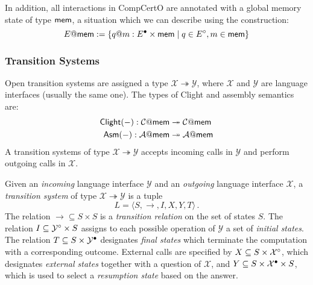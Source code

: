 \documentclass[acmsmall,review,anonymous]{acmart}\settopmatter{printfolios=true,printccs=false,printacmref=false}
\begin{document}
In addition,
all interactions in CompCertO
are annotated with a global memory state of type $ \mathsf{mem} $,
a situation which we can describe using the construction:
\[
  E@ \mathsf{mem}  := \{ q@m : E^\bullet \times  \mathsf{mem}  \mid
                   q \in E^\circ, m \in  \mathsf{mem}  \}
\]


\subsubsection{Transition Systems}

Open transition systems
are assigned a type
$\mathcal{X} \twoheadrightarrow \mathcal{Y}$,
where $\mathcal{X}$ and $\mathcal{Y}$ are
language interfaces (usually the same one).
The types of Clight and assembly semantics
are:
\begin{align*}
   \mathsf{Clight} (-) :
    \mathcal{C}@ \mathsf{mem} 
   &\twoheadrightarrow
    \mathcal{C}@ \mathsf{mem} 
  \\
   \mathsf{Asm} (-) :
    \mathcal{A}@ \mathsf{mem} 
   &\twoheadrightarrow
    \mathcal{A}@ \mathsf{mem} 
\end{align*}
A transition systems of type $\mathcal{X} \twoheadrightarrow \mathcal{Y}$
accepts incoming calls in $\mathcal{Y}$
and perform outgoing calls in $\mathcal{X}$.

\begin{definition}
Given an \emph{incoming} language interface $\mathcal{Y}$
and an \emph{outgoing} language interface $\mathcal{X}$,
a \emph{transition system} of type
$\mathcal{X} \twoheadrightarrow \mathcal{Y}$
is a tuple \[ L = \langle S, \rightarrow, I, X, Y, T \rangle \,. \]
The relation
${\rightarrow} \subseteq S \times S$ is
a \emph{transition relation} on the set of states $S$.
The relation
$I \subseteq \mathcal{Y}^\circ \times S$ 
assigns to each possible operation of $\mathcal{Y}$
a set of \emph{initial states}.
The relation
$T \subseteq S \times \mathcal{Y}^\bullet$
designates \emph{final states}
which terminate the computation with a corresponding outcome.
External calls are specified by
$X \subseteq S \times \mathcal{X}^\circ$,
which designates \emph{external states} together with
a question of $\mathcal{X}$, and
$Y \subseteq S \times \mathcal{X}^\bullet \times S$,
which is used to select a \emph{resumption state}
based on the answer.
\end{definition}
\end{document}
